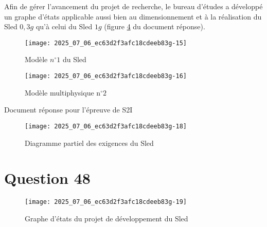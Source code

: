 \ifprof
\else
Afin de gérer l'avancement du projet de recherche, le bureau d'études a développé un graphe d'états applicable aussi bien au dimensionnement et à la réalisation du Sled $0,3 g$ qu'à celui du Sled $1 g$ (figure \ref{ccs_mp_2022_fig_B} du document réponse).
\fi

\ifprof
\begin{corrige}
\end{corrige}
\else
\fi

\ifprof
\else

\begin{figure}[!h]
\centering

\texttt{[image: 2025\_07\_06\_ec63d2f3afc18cdeeb83g-15]}
\caption{\label{ccs_mp_2022_fig_20}Modèle $n^{\circ} 1$ du Sled}
\end{figure}


\begin{figure}[!h]
\centering
\texttt{[image: 2025\_07\_06\_ec63d2f3afc18cdeeb83g-16]}

\caption{\label{ccs_mp_2022_fig_21}Modèle multiphysique $\mathrm{n}^{\circ} 2$}
\end{figure}

\fi



\ifprof
\else
Document réponse pour l'épreuve de S2I\\

\begin{figure}[!h]
\centering
\texttt{[image: 2025\_07\_06\_ec63d2f3afc18cdeeb83g-18]}

\caption{\label{ccs_mp_2022_fig_A}Diagramme partiel des exigences du Sled}
\end{figure}

\section*{Question 48}
\begin{figure}[!h]
\centering

\texttt{[image: 2025\_07\_06\_ec63d2f3afc18cdeeb83g-19]}

\caption{\label{ccs_mp_2022_fig_B}Graphe d'états du projet de développement du Sled}
\end{figure}

\fi